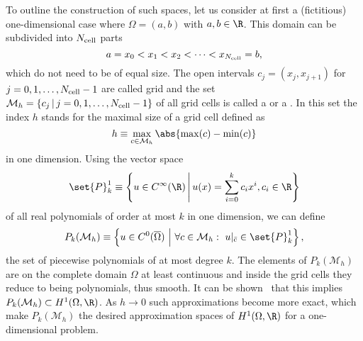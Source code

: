 To outline the construction of such spaces,
let us consider at first a (fictitious) one-dimensional case
where $\Omega = (a,b)$ with $a,b \in \R$.
This domain can be subdivided into $N_\text{cell}$ parts
\[ a = x_0 < x_1 < x_2 < \cdots < x_{N_\text{cell}} = b, \]
which do not need to be of equal size.
The open intervals $c_j = (x_j, x_{j+1})$ for $j=0, 1, \ldots, N_\text{cell}-1$
are called grid 
and the set $\mathcal{M}_h = \{c_j \, | \, j=0, 1, \ldots, N_\text{cell}-1 \}$
of all grid cells is called a  or a .
In this set the index $h$ stands for the maximal size of a grid cell
defined as
\[ h \equiv \max_{c \in \mathcal{M}_h} \abs{\max(c) - \min(c)} \]
in one dimension. Using the vector space
\[
	\set{P}_k^1 \equiv \left\{ u \in C^\infty(\R) \,\middle|\, u(x) = \sum_{i=0}^k c_i x^i, c_i \in \R \right\}
\]
of all real polynomials of order at most $k$ in one dimension,
we can define
\begin{equation}
	P_k(\mathcal{M}_h)
	\equiv \left\{ u \in C^0(\overline{\Omega}) \ \middle| \
	\forall c \in \mathcal{M}_h: \
	u|_{\bar{c}} \in \set{P}_k^1 \right\},
	\label{eqn:PiecewisePolynomialsOne}
\end{equation}
the set of piecewise polynomials of at most degree $k$.
The elements of $P_k(\mathcal{M}_h)$
are on the complete domain $\Omega$ at least continuous
and inside the grid cells
they reduce to being polynomials, thus smooth.
It can be shown~\cite[Lemma 4.1]{Grossmann1992} that this implies
$P_k(\mathcal{M}_h) \subset H^1(\Omega, \R)$.
As $h \to 0$ such approximations become more exact,
which make $P_k(\mathcal{M}_h)$ the desired approximation
spaces of $H^1(\Omega, \R)$ for a one-dimensional problem.

